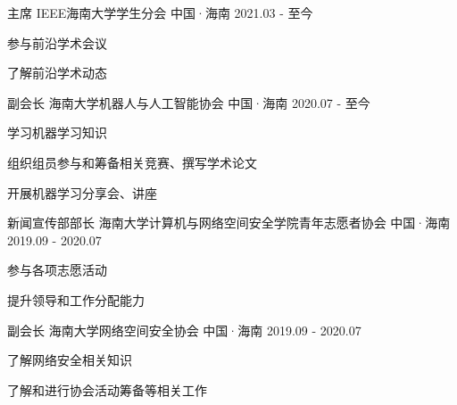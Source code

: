 

\begin{cventries}
    \cventry
    {主席} %
    {IEEE海南大学学生分会} %
    {中国·海南} %
    {2021.03 - 至今} %
    {
        \begin{cvitems} %
            \item{参与前沿学术会议}
            \item{了解前沿学术动态}
        \end{cvitems}
    }


    \cventry
    {副会长} %
    {海南大学机器人与人工智能协会} %
    {中国·海南} %
    {2020.07 - 至今} %
    {
        \begin{cvitems} %
            \item{学习机器学习知识}
            \item{组织组员参与和筹备相关竞赛、撰写学术论文}
            \item{开展机器学习分享会、讲座}
        \end{cvitems}
    }

    \cventry
    {新闻宣传部部长} %
    {海南大学计算机与网络空间安全学院青年志愿者协会} %
    {中国·海南} %
    {2019.09 - 2020.07} %
    {
        \begin{cvitems} %
        \item {参与各项志愿活动}
        \item {提升领导和工作分配能力}
        \end{cvitems}
    }

    \cventry
    {副会长} %
    {海南大学网络空间安全协会} %
    {中国·海南} %
    {2019.09 - 2020.07} %
    {
        \begin{cvitems} %
            \item{了解网络安全相关知识}
            \item{了解和进行协会活动筹备等相关工作}
        \end{cvitems}
    }
\end{cventries}
